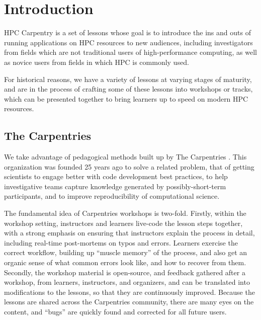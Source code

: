 
\section{Introduction}

HPC Carpentry is a set of lessons whose goal is to introduce the ins and outs of running applications on HPC resources to new audiences, including investigators from fields which are not traditional users of high-performance computing, as well as novice users from fields in which HPC is commonly used.

For historical reasons, we have a variety of lessons at varying stages of maturity, and are in the process of crafting some of these lessons into workshops or tracks, which can be presented together to bring learners up to speed on modern HPC resources.

\subsection{The Carpentries}

We take advantage of pedagogical methods built up by The Carpentries \cite{carpentries}. This organization was founded 25 years ago to solve a related problem, that of getting scientists to engage better with code development best practices, to help investigative teams capture knowledge generated by possibly-short-term participants, and to improve reproducibility of computational science.

The fundamental idea of Carpentries workshops is two-fold. Firstly, within the workshop setting, instructors and learners live-code the lesson steps together, with a strong emphasis on ensuring that instructors explain the process in detail, including real-time post-mortems on typos and errors. Learners exercise the correct workflow, building up ``muscle memory'' of the process, and also get an organic sense of what common errors look like, and how to recover from them. Secondly, the workshop material is open-source, and feedback gathered after a workshop, from learners, instructors, and organizers, and can be translated into modifications to the lessons, so that they are continuously improved. Because the lessons are shared across the Carpentries community, there are many eyes on the content, and ``bugs'' are quickly found and corrected for all future users.

